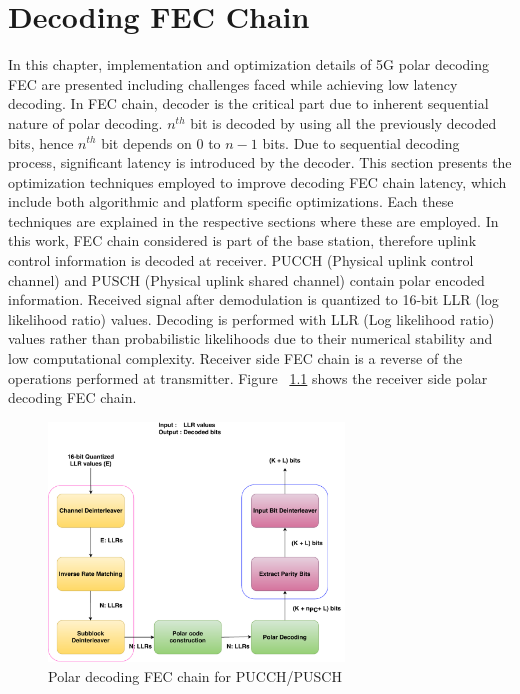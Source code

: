 \chapter{Decoding FEC Chain} \label{chap:DecodingChain}
In this chapter, implementation and optimization details of 5G polar decoding FEC are presented including challenges faced while achieving low latency decoding. In FEC chain, decoder is the critical part due to inherent sequential nature of polar decoding. $n^{th}$ bit is decoded by using all the previously decoded bits, hence $n^{th}$ bit depends on $0$ to $n-1$ bits. Due to sequential decoding process, significant latency is introduced by the decoder. This section presents the optimization techniques employed to improve decoding FEC chain latency, which include both algorithmic and platform specific optimizations. Each these techniques are explained in the respective sections where these are employed. In this work, FEC chain considered is part of the base station, therefore uplink control information is decoded at receiver. PUCCH (Physical uplink control channel) and PUSCH (Physical uplink shared channel) contain polar encoded information. Received signal after demodulation is quantized to 16-bit LLR (log likelihood ratio) values. Decoding is performed with LLR (Log likelihood ratio) values rather than probabilistic likelihoods due to their numerical stability and low computational complexity. Receiver side FEC chain is a reverse of the operations performed at transmitter. Figure ~\ref{fig:5grx_fec_chain} shows the receiver side polar decoding FEC chain.

\begin{figure}[]
	\centering
	\includegraphics[width=0.7\textwidth]{./figures/receiverFECChain.pdf}
	\caption{Polar decoding FEC chain for PUCCH/PUSCH}
	\label{fig:5grx_fec_chain}
\end{figure}

